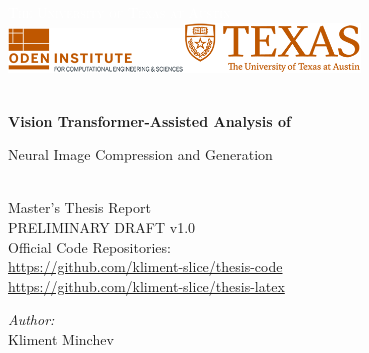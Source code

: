 \begin{titlepage}


\TITLEBOX

\begin{center}



\sffamily\textsc{\huge{\textcolor{white}{The University of Texas at Austin}}}\\[4cm]


\includegraphics[width=0.35\textwidth]{media/faculty.png}\makebox[1.5cm]{}\includegraphics[width=0.35\textwidth]{media/unilogo.png}~\\[1.5cm]



\HRule \\[0.4cm]
{
 \huge \bfseries \sffamily Vision Transformer-Assisted Analysis of
 
Neural Image Compression and Generation  \\[0.4cm] 
}

\HRule \\[0.4cm] 

\normalfont \LARGE \sffamily Master's Thesis Report \\[1.5cm]
\normalfont \large \sffamily PRELIMINARY DRAFT v1.0 \\[0.5cm]
\normalfont \large \sffamily Official Code Repositories: \\
\normalfont \large \sffamily \url{https://github.com/kliment-slice/thesis-code} \\[0.05cm]
\normalfont \large \sffamily \url{https://github.com/kliment-slice/thesis-latex} \\[1.0cm]

\noindent
\begin{minipage}{0.4\textwidth}
\begin{center} \large
\emph{Author:}\\
Kliment Minchev\\
\end{center}
\end{minipage}


\end{center}
\end{titlepage}
